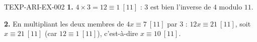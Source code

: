 \begin{corrige}{TEXP-ARI-EX-002}
\textbf{1.} $4\times3=12\equiv1\ [11]$ : $3$ est bien l'inverse de $4$ modulo $11$.

\textbf{2.} En multipliant les deux membres de $4x\equiv7\ [11]$ par $3$ : $12x\equiv21\ [11]$, soit $x\equiv21\ [11]$ (car $12\equiv1\ [11]$), c'est-à-dire $x\equiv10\ [11]$.
\end{corrige}
